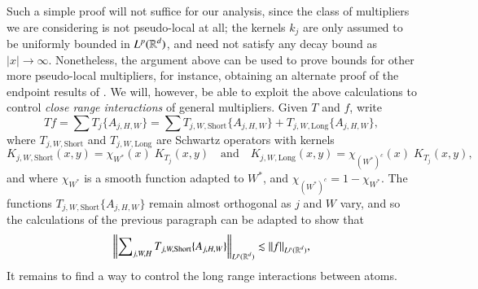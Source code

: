 Such a simple proof will not suffice for our analysis, since the class of multipliers we are considering is not pseudo-local at all; the kernels $k_j$ are only assumed to be uniformly bounded in $L^p(\operatorname{\mathbb{R}}^d)$, and need not satisfy any decay bound as $|x| \to \infty$. Nonetheless, the argument above can be used to prove bounds for other more pseudo-local multipliers, for instance, obtaining an alternate proof of the endpoint results of \cite{SeegerSingular}. We will, however, be able to exploit the above calculations to control \emph{close range interactions} of general multipliers. Given $T$ and $f$, write
%
\begin{equation}
  Tf = \sum T_j \{ A_{j,H,W} \} = \sum T_{j,W,\text{Short}} \{ A_{j,H,W} \} + T_{j,W,\text{Long}} \{ A_{j,H,W} \},
\end{equation}
%
where $T_{j,W,\text{Short}}$ and $T_{j,W,\text{Long}}$ are Schwartz operators with kernels
%
\begin{equation}
  K_{j,W,\text{Short}}(x,y) = \chi_{W^*}(x)\; K_{T_j}(x,y) \quad\text{and}\quad K_{j,W,\text{Long}}(x,y) = \chi_{(W^*)^c}(x)\; K_{T_j}(x,y),
\end{equation}
%
and where $\chi_{W^*}$ is a smooth function adapted to $W^*$, and $\chi_{(W^*)^c} = 1 - \chi_{W^*}$. The functions $T_{j,W,\text{Short}} \{ A_{j,H,W} \}$ remain almost orthogonal as $j$ and $W$ vary, and so the calculations of the previous paragraph can be adapted to show that
%
\begin{equation}
  \left\| \sum\nolimits_{j,W,H} T_{j,W,\text{Short}} \{ A_{j,H,W} \} \right\|_{L^p(\operatorname{\mathbb{R}}^d)} \lesssim \| f \|_{L^p(\operatorname{\mathbb{R}}^d)},
\end{equation}
%
It remains to find a way to control the long range interactions between atoms.

